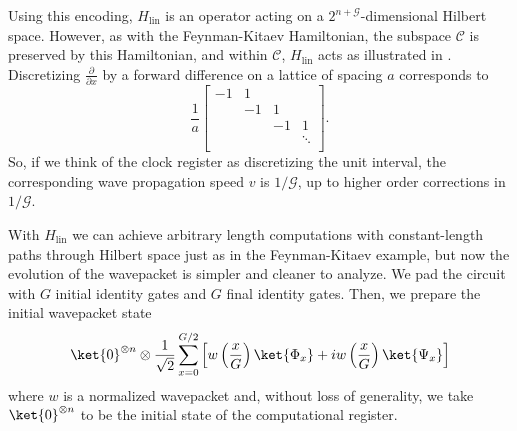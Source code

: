 \documentclass[11pt]{article}
\begin{document}
Using this encoding, $H_{\mathrm{lin}}$ is an operator acting on a $2^{n+\mathcal{G}}$-dimensional Hilbert space. However, as with the Feynman-Kitaev Hamiltonian, the subspace $\mathcal{C}$ is preserved by this Hamiltonian, and within $\mathcal{C}$, $H_{\mathrm{lin}}$ acts as illustrated in . Discretizing $\frac{\partial}{\partial x}$ by a forward difference on a lattice of spacing $a$ corresponds to
\[
\frac{1}{a} \left[ \begin{array}{rrrr}
-1&  1 &    & \\
  & -1 &  1 & \\
  &    & -1 & 1 \\
  &    &    & \ddots \\ 
\end{array} \right].
\]
So, if we think of the clock register as discretizing the unit interval, the corresponding wave propagation speed $v$ is $1/\mathcal{G}$, up to higher order corrections in $1/\mathcal{G}$.

With $H_{\mathrm{lin}}$ we can achieve arbitrary length computations with constant-length paths through Hilbert space just as in the Feynman-Kitaev example, but now the evolution of the wavepacket is simpler and cleaner to analyze. We pad the circuit with $G$ initial identity gates and $G$ final identity gates. Then, we prepare the initial wavepacket state
\begin{equation}
\ket{0}^{\otimes n} \otimes \frac{1}{\sqrt{2}} \sum_{x=0}^{G/2} \left[  w\left( \frac{x}{G} \right) \ket{\Phi_x} + i w \left( \frac{x}{G} \right) \ket{\Psi_x} \right]
\end{equation}
where $w$ is a normalized wavepacket and, without loss of generality, we take $\ket{0}^{\otimes n}$ to be the initial state of the computational register. 
\end{document}
